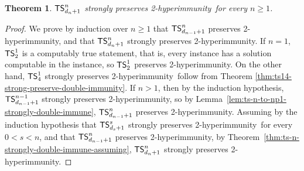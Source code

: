 \documentclass{amsart}
\newtheorem{theorem}{Theorem}[section]
\theoremstyle{definition}
\theoremstyle{remark}
\numberwithin{equation}{section}
\theoremstyle{noparens}
\def\propertyL{2-hyperimmunity}
\newcommand{\s}[1]{\ensuremath{\sf{#1}}}
\DeclareMathOperator{\ts}{\s{TS}}
\begin{document}
\begin{theorem}\label{thm:ts-n-strongly-preserves-double}
$\ts^n_{d_n+1}$ strongly preserves \propertyL\ for every $n \geq 1$.
\end{theorem}
\begin{proof}
We prove by induction over $n \geq 1$ that
$\ts^n_{d_{n-1}+1}$ preserves \propertyL, and that $\ts^n_{d_n+1}$ strongly preserves \propertyL.
If $n = 1$, $\ts^1_2$ is a computably true statement, that is, every instance
has a solution computable in the instance, so $\ts^1_2$ preserves \propertyL.
On the other hand, $\ts^1_4$ strongly preserves \propertyL\ follow from Theorem \ref{thm:ts14-strong-preserve-double-immunity}.
If $n > 1$, then by the induction hypothesis, $\ts^{n-1}_{d_{n-1}+1}$ strongly preserves \propertyL,
so by Lemma~\ref{lem:ts-n-to-np1-strongly-double-immune}, $\ts^n_{d_{n-1}+1}$ preserves \propertyL.
Assuming by  the induction hypothesis that $\ts^s_{d_s+1}$ strongly preserves \propertyL\
for every $0 < s < n$, and that $\ts^n_{d_{n-1}+1}$ preserves \propertyL,
by Theorem~\ref{thm:ts-n-strongly-double-immune-assuming}, $\ts^n_{d_n+1}$ strongly preserves \propertyL.
\end{proof}
\end{document}
